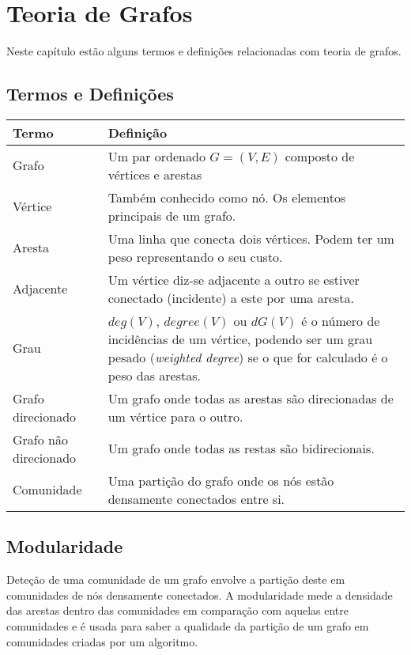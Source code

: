 \chapter{Teoria de Grafos}
Neste capítulo estão alguns termos e definições relacionadas com teoria de grafos.
\section{Termos e Definições}
		\begin{tabular}{|l | p{12cm} |}
			\hline
			\textbf{Termo} & \textbf{Definição} \\ \hline
			Grafo & Um par ordenado $G = (V,E)$ composto de vértices e arestas \\ \hline
			Vértice & Também conhecido como nó. Os elementos principais de um grafo. \\ \hline
			Aresta & Uma linha que conecta dois vértices. Podem ter um peso representando o seu custo. \\ \hline
			Adjacente & Um vértice diz-se adjacente a outro se estiver conectado (incidente) a este por uma aresta. \\ \hline
			Grau & $deg(V)$, $degree(V)$ ou $dG(V)$ é o número de incidências de um vértice, podendo ser um grau pesado (\textit{weighted degree}) se o que for calculado é o peso das arestas. \\ \hline
			Grafo direcionado & Um grafo onde todas as arestas são direcionadas de um vértice para o outro. \\ \hline
			Grafo não direcionado & Um grafo onde todas as restas são bidirecionais. \\ \hline
			Comunidade & Uma partição do grafo onde os nós estão densamente conectados entre si. \\ \hline
			
		\end{tabular}

\section{Modularidade}
Deteção de uma comunidade de um grafo envolve a partição deste em comunidades de nós densamente conectados. A modularidade mede a densidade das arestas dentro das comunidades em comparação com aquelas entre comunidades e é usada para saber a qualidade da partição de um grafo em comunidades criadas por um algoritmo. 


